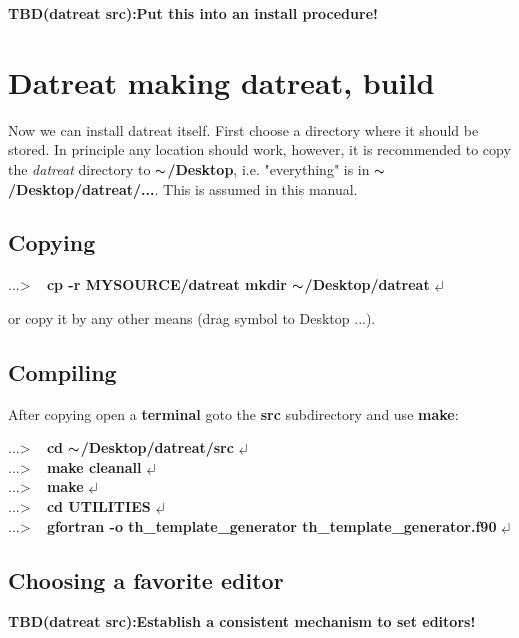 \documentclass[11pt,fleqn]{book} %
\newcommand{\return}{$\carriagereturn$} %
\newcommand{\sysprompt}{{\color{green}...\textgreater} ~ }
\newcommand{\home}{${\thicksim}$/Desktop}
\newcommand{\enter}[1]{{\color{red} \bf #1}}
\newcommand{\tbd}[1]{\vskip 0.5cm {\bf {\color{green} TBD(datreat src):#1 }} \vskip 0.5cm}
\newcommand{\desc}[1]{\hskip 0.5cm {\color{descgray} #1}}
\begin{document}
\tbd{Put this into an install procedure!}

\section{Datreat \desc{making datreat, build}}
Now we can install datreat itself. First choose a directory where it should be stored.
In principle any location should work, however, it is recommended to copy the
\emph{datreat} directory to {\bf \home}, i.e. "everything" is in
{\bf \home/datreat/...}. This is assumed in this manual.

\subsection{Copying}
\begin{corollary}
\sysprompt {\bf cp -r MYSOURCE/datreat mkdir \home/datreat} \return
\end{corollary}
 or copy it by any other means (drag symbol to Desktop ...).

\subsection{Compiling}
After copying open a {\bf terminal} goto the {\bf src} subdirectory and use {\bf make}:

\begin{corollary}
\sysprompt {\bf cd \home/datreat/src        } \return  \\
\sysprompt {\bf make cleanall               } \return  \\
\sysprompt {\bf make                        } \return  \\
\sysprompt {\bf cd UTILITIES                } \return  \\
\sysprompt {\bf gfortran -o th\_template\_generator   th\_template\_generator.f90}  \return  \\
\end{corollary}

\subsection{Choosing a favorite editor}
\tbd{Establish a consistent mechanism to set editors!}
\end{document}
